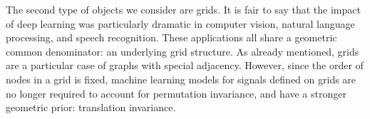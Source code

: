 
The second type of objects we consider are grids. 
%
It is fair to say that the impact of deep learning was particularly dramatic in computer vision,  natural language processing, and speech recognition. These applications all share a %
geometric common denominator: an underlying grid structure. 
%
As already mentioned, grids are a particular case of graphs with special adjacency. However, since the order of nodes in a grid is fixed, machine learning models for signals defined on grids are no longer required to account for permutation invariance, and have a stronger geometric prior: translation invariance. 




